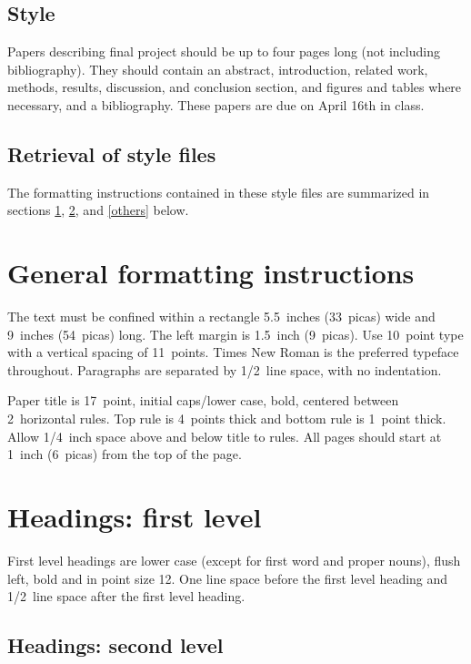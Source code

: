 \documentclass{article} %
\begin{document}
\subsection{Style}

Papers describing final project should be up to four pages long (not including bibliography). They should contain an abstract, introduction, related work, methods, results, discussion, and conclusion section, and figures and tables where necessary, and a bibliography. These papers are due on April 16th in class.


\subsection{Retrieval of style files}

The formatting instructions contained in these style files are summarized in
sections \ref{gen_inst}, \ref{headings}, and \ref{others} below.

\section{General formatting instructions}
\label{gen_inst}

The text must be confined within a rectangle 5.5~inches (33~picas) wide and
9~inches (54~picas) long. The left margin is 1.5~inch (9~picas).
Use 10~point type with a vertical spacing of 11~points. Times New Roman is the
preferred typeface throughout. Paragraphs are separated by 1/2~line space,
with no indentation.

Paper title is 17~point, initial caps/lower case, bold, centered between
2~horizontal rules. Top rule is 4~points thick and bottom rule is 1~point
thick. Allow 1/4~inch space above and below title to rules. All pages should
start at 1~inch (6~picas) from the top of the page.


\section{Headings: first level}
\label{headings}

First level headings are lower case (except for first word and proper nouns),
flush left, bold and in point size 12. One line space before the first level
heading and 1/2~line space after the first level heading.

\subsection{Headings: second level}
\end{document}
